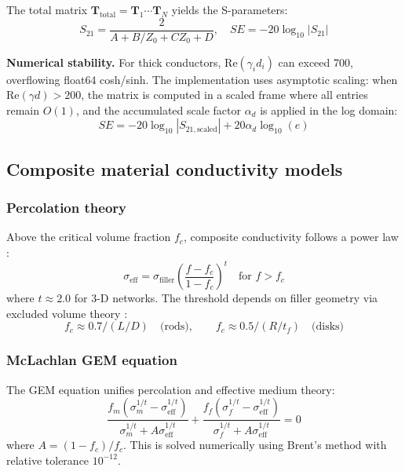 \documentclass[review,3p,authoryear]{elsarticle}
\begin{document}
The total matrix $\mathbf{T}_\mathrm{total} = \mathbf{T}_1 \cdots \mathbf{T}_N$ yields the S-parameters:
\begin{equation}
S_{21} = \frac{2}{A + B/Z_0 + CZ_0 + D}, \quad SE = -20\log_{10}|S_{21}|
\label{eq:s21}
\end{equation}

\textbf{Numerical stability.} For thick conductors, $\mathrm{Re}(\gamma_i d_i)$ can exceed 700, overflowing float64 cosh/sinh. The implementation uses asymptotic scaling: when $\mathrm{Re}(\gamma d) > 200$, the matrix is computed in a scaled frame where all entries remain $O(1)$, and the accumulated scale factor $\alpha_d$ is applied in the log domain:
\begin{equation}
SE = -20\log_{10}|S_{21,\mathrm{scaled}}| + 20\alpha_d\log_{10}(e)
\label{eq:overflow}
\end{equation}

\subsection{Composite material conductivity models}
\label{sec:composites}

\subsubsection{Percolation theory}

Above the critical volume fraction $f_c$, composite conductivity follows a power law \citep{Kirkpatrick1973}:
\begin{equation}
\sigma_\mathrm{eff} = \sigma_\mathrm{filler} \left(\frac{f - f_c}{1 - f_c}\right)^t \quad \text{for } f > f_c
\label{eq:percolation}
\end{equation}
where $t \approx 2.0$ for 3-D networks. The threshold depends on filler geometry via excluded volume theory \citep{Balberg1984, Celzard1996}:
\begin{equation}
f_c \approx 0.7 / (L/D) \quad \text{(rods)}, \qquad f_c \approx 0.5 / (R/t_f) \quad \text{(disks)}
\label{eq:threshold}
\end{equation}

\subsubsection{McLachlan GEM equation}

The GEM equation \citep{McLachlan1990} unifies percolation and effective medium theory:
\begin{equation}
\frac{f_m(\sigma_m^{1/t} - \sigma_\mathrm{eff}^{1/t})}{\sigma_m^{1/t} + A\sigma_\mathrm{eff}^{1/t}} + \frac{f_f(\sigma_f^{1/t} - \sigma_\mathrm{eff}^{1/t})}{\sigma_f^{1/t} + A\sigma_\mathrm{eff}^{1/t}} = 0
\label{eq:gem}
\end{equation}
where $A = (1 - f_c)/f_c$. This is solved numerically using Brent's method with relative tolerance $10^{-12}$.
\end{document}
